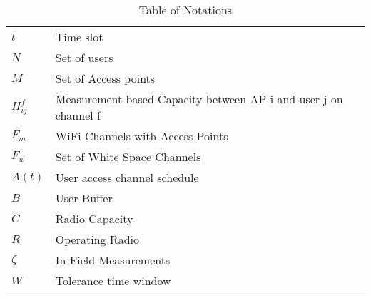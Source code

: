 \begin{table}[htbp]
\begin{center}%
\begin{tabular}{l l p{10cm} }
\toprule
$t$ & Time slot\\
$N$ & Set of users\\
$M$ & Set of Access points\\
$H_{ij}^f$ & Measurement based Capacity between AP i and user j on channel f\\
$F_{m}$ & WiFi Channels with Access Points\\
$F_{w}$ & Set of White Space Channels\\
$A(t)$ & User access channel schedule\\
$B$ & User Buffer\\
$C$ & Radio Capacity\\
$R$ & Operating Radio\\
$\zeta$ & In-Field Measurements\\
$W$ & Tolerance time window \\
\bottomrule
\end{tabular}
\end{center}
\caption{Table of Notations}
\label{tab:notation}
\end{table}
